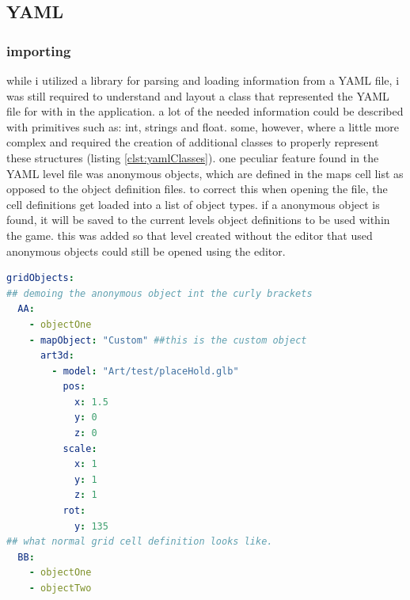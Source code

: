 \subsection{YAML}
\subsubsection{importing}
while i utilized a library for parsing and loading information from a YAML file, i was still required to understand and layout a class that represented the YAML file for with in the application. a lot of the needed information could be described with primitives such as: int, strings and float. some, however, where a little more complex and required the creation of additional classes to properly represent these structures (listing \ref{clst:yamlClasses}). one peculiar feature found in the YAML level file was anonymous objects, which are defined in the maps cell list as opposed to the object definition files. to correct this when opening the file, the cell definitions get loaded into a list of object types. if a anonymous object is found, it will be saved to the current levels object definitions to be used within the game. this was added so that level created without the editor that used anonymous objects could still be opened using the editor.

\begin{minipage}{\textwidth}
\begin{lstlisting}[language=yaml, caption=demonstartion of anaymous object, label=ylst:anonObjDemo]
gridObjects:
## demoing the anonymous object int the curly brackets
  AA:
    - objectOne
    - mapObject: "Custom" ##this is the custom object
      art3d:
        - model: "Art/test/placeHold.glb"
          pos:
            x: 1.5
            y: 0
            z: 0
          scale:
            x: 1
            y: 1
            z: 1
          rot:
            y: 135
## what normal grid cell definition looks like.
  BB:
    - objectOne
    - objectTwo
\end{lstlisting}
\end{minipage}

